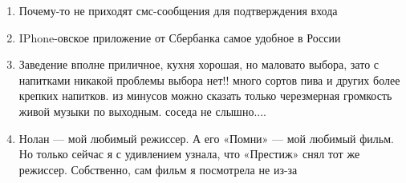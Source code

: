 \begin{enumerate}
    \item \colorbox{yellow!70}{Почему-то}
\colorbox{yellow!100}{не}
\colorbox{yellow!57}{приходят}
\colorbox{yellow!17}{смс-сообщения}
\colorbox{yellow!5}{для}
\colorbox{yellow!7}{подтверждения}
\colorbox{yellow!0}{входа}
    \item \colorbox{yellow!3}{IPhone-овское}
\colorbox{yellow!2}{приложение}
\colorbox{yellow!2}{от}
\colorbox{yellow!30}{Сбербанка}
\colorbox{yellow!89}{самое}
\colorbox{yellow!100}{удобное}
\colorbox{yellow!84}{в}
\colorbox{yellow!82}{России}
    \item \colorbox{yellow!14}{Заведение}
\colorbox{yellow!41}{вполне}
\colorbox{yellow!62}{приличное,}
\colorbox{yellow!78}{кухня}
\colorbox{yellow!99}{хорошая,}
\colorbox{yellow!27}{но}
\colorbox{yellow!25}{маловато}
\colorbox{yellow!11}{выбора,}
\colorbox{yellow!8}{зато}
\colorbox{yellow!2}{с}
\colorbox{yellow!2}{напитками}
\colorbox{yellow!2}{никакой}
\colorbox{yellow!2}{проблемы}
\colorbox{yellow!3}{выбора}
\colorbox{yellow!2}{нет!!}
\colorbox{yellow!2}{много}
\colorbox{yellow!2}{сортов}
\colorbox{yellow!2}{пива}
\colorbox{yellow!3}{и}
\colorbox{yellow!2}{других}
\colorbox{yellow!1}{более}
\colorbox{yellow!2}{крепких}
\colorbox{yellow!1}{напитков.}
\colorbox{yellow!1}{из}
\colorbox{yellow!3}{минусов}
\colorbox{yellow!3}{можно}
\colorbox{yellow!4}{сказать}
\colorbox{yellow!4}{только}
\colorbox{yellow!10}{черезмерная}
\colorbox{yellow!8}{громкость}
\colorbox{yellow!12}{живой}
\colorbox{yellow!8}{музыки}
\colorbox{yellow!4}{по}
\colorbox{yellow!5}{выходным.}
\colorbox{yellow!6}{соседа}
\colorbox{yellow!11}{не}
\colorbox{yellow!11}{слышно....}
    \item \colorbox{yellow!4}{Нолан}
\colorbox{yellow!0}{—}    
\colorbox{yellow!6}{мой}
\colorbox{yellow!6}{любимый}
\colorbox{yellow!8}{режиссер.}
\colorbox{yellow!3}{А}
\colorbox{yellow!4}{его}
\colorbox{yellow!3}{«Помни»}
\colorbox{yellow!0}{—}
\colorbox{yellow!4}{мой}
\colorbox{yellow!4}{любимый}
\colorbox{yellow!4}{фильм.}
\colorbox{yellow!2}{Но}
\colorbox{yellow!1}{только}
\colorbox{yellow!0}{сейчас}
\colorbox{yellow!0}{я}
\colorbox{yellow!1}{с}
\colorbox{yellow!3}{удивлением}
\colorbox{yellow!2}{узнала,}
\colorbox{yellow!2}{что}
\colorbox{yellow!4}{«Престиж»}
\colorbox{yellow!1}{снял}
\colorbox{yellow!2}{тот}
\colorbox{yellow!2}{же}
\colorbox{yellow!7}{режиссер.}
\colorbox{yellow!5}{Собственно,}
\colorbox{yellow!6}{сам}
\colorbox{yellow!11}{фильм}
\colorbox{yellow!2}{я}
\colorbox{yellow!0}{посмотрела}
\colorbox{yellow!2}{не}
\colorbox{yellow!3}{из-за}

\end{enumerate}
